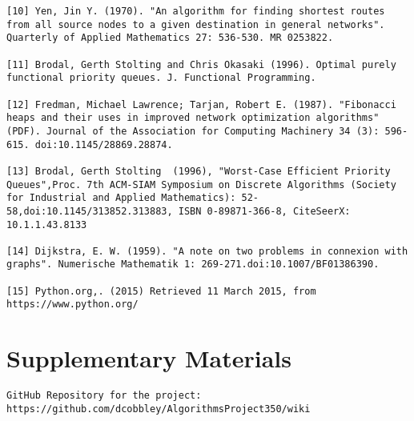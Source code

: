 \documentclass{article}
\begin{document}
\begin{lstlisting}
[10] Yen, Jin Y. (1970). "An algorithm for finding shortest routes from all source nodes to a given destination in general networks". Quarterly of Applied Mathematics 27: 536-530. MR 0253822.

[11] Brodal, Gerth Stolting and Chris Okasaki (1996). Optimal purely functional priority queues. J. Functional Programming.

[12] Fredman, Michael Lawrence; Tarjan, Robert E. (1987). "Fibonacci heaps and their uses in improved network optimization algorithms"(PDF). Journal of the Association for Computing Machinery 34 (3): 596-615. doi:10.1145/28869.28874.

[13] Brodal, Gerth Stolting  (1996), "Worst-Case Efficient Priority Queues",Proc. 7th ACM-SIAM Symposium on Discrete Algorithms (Society for Industrial and Applied Mathematics): 52-58,doi:10.1145/313852.313883, ISBN 0-89871-366-8, CiteSeerX: 10.1.1.43.8133

[14] Dijkstra, E. W. (1959). "A note on two problems in connexion with graphs". Numerische Mathematik 1: 269-271.doi:10.1007/BF01386390.

[15] Python.org,. (2015) Retrieved 11 March 2015, from https://www.python.org/

\end{lstlisting}

\section{Supplementary Materials}
\begin{verbatim}
GitHub Repository for the project:
https://github.com/dcobbley/AlgorithmsProject350/wiki
\end{verbatim}
\end{document}
